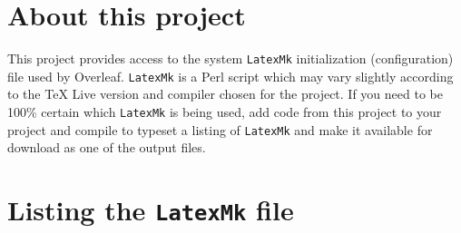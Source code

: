 \documentclass[a4paper]{article}
\begin{document}
\section*{About this project}
This project provides access to the system \texttt{LatexMk} initialization (configuration) file used by Overleaf.  \texttt{LatexMk} is a Perl script which may vary slightly according to the \TeX{} Live version and compiler chosen for the project. If you need to be 100\% certain which  \texttt{LatexMk} is being used, add code from this project to your project and compile to typeset a listing of \texttt{LatexMk} and make it available for download as one of the output files.
\section*{Listing the \texttt{LatexMk} file}


\end{document}
